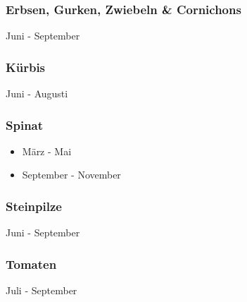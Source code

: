 \documentclass{beamer}
\begin{document}
\begin{frame}
  \frametitle{Erbsen, Gurken, Zwiebeln \& Cornichons}
Juni - September
\end{frame}

\begin{frame}
\frametitle{Kürbis}
Juni - Augusti
\end{frame}

\begin{frame}
\frametitle{Spinat}
  \begin{itemize}
    \item
März - Mai
\item
  September - November
  \end{itemize}
\end{frame}

\begin{frame}
\frametitle{Steinpilze}
Juni - September
\end{frame}

\begin{frame}
\frametitle{Tomaten}
Juli - September
\end{frame}








\end{document}
